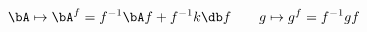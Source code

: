 \begin{equation}
\bA \mapsto \bA^{f}=f^{-1}\bA f + f^{-1}k\db f
\qquad
g \mapsto g^{f}=f^{-1}g f
\label{gtrans}
\end{equation}

